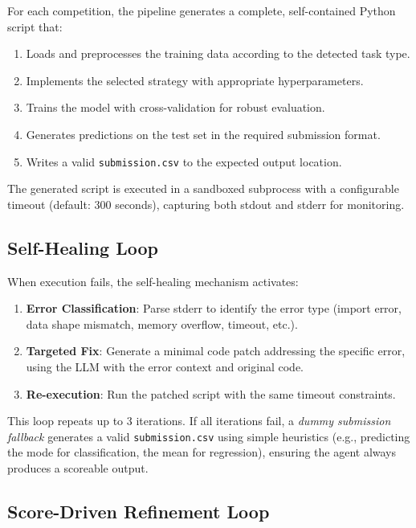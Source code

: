 \documentclass[11pt]{article}
\begin{document}
For each competition, the pipeline generates a complete, self-contained Python script that:
\begin{enumerate}[leftmargin=*,itemsep=1pt]
  \item Loads and preprocesses the training data according to the detected task type.
  \item Implements the selected strategy with appropriate hyperparameters.
  \item Trains the model with cross-validation for robust evaluation.
  \item Generates predictions on the test set in the required submission format.
  \item Writes a valid \texttt{submission.csv} to the expected output location.
\end{enumerate}

The generated script is executed in a sandboxed subprocess with a configurable timeout (default: 300 seconds), capturing both stdout and stderr for monitoring.

\subsection{Self-Healing Loop}

When execution fails, the self-healing mechanism activates:

\begin{enumerate}[leftmargin=*,itemsep=1pt]
  \item \textbf{Error Classification}: Parse stderr to identify the error type (import error, data shape mismatch, memory overflow, timeout, etc.).
  \item \textbf{Targeted Fix}: Generate a minimal code patch addressing the specific error, using the LLM with the error context and original code.
  \item \textbf{Re-execution}: Run the patched script with the same timeout constraints.
\end{enumerate}

This loop repeats up to 3 iterations. If all iterations fail, a \emph{dummy submission fallback} generates a valid \texttt{submission.csv} using simple heuristics (e.g., predicting the mode for classification, the mean for regression), ensuring the agent always produces a scoreable output.

\subsection{Score-Driven Refinement Loop}
\end{document}
